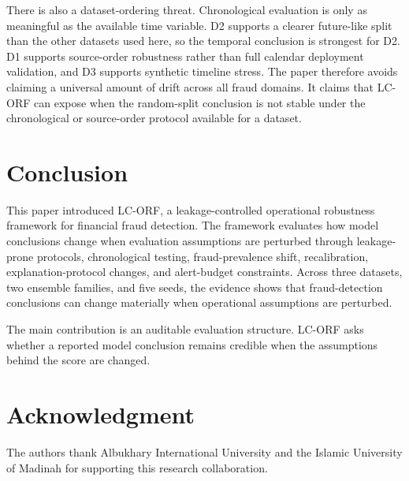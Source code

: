 \documentclass{ieeeaccess}
\begin{document}
There is also a dataset-ordering threat. Chronological evaluation is only as meaningful as the available time variable. D2 supports a clearer future-like split than the other datasets used here, so the temporal conclusion is strongest for D2. D1 supports source-order robustness rather than full calendar deployment validation, and D3 supports synthetic timeline stress. The paper therefore avoids claiming a universal amount of drift across all fraud domains. It claims that LC-ORF can expose when the random-split conclusion is not stable under the chronological or source-order protocol available for a dataset.

\section{Conclusion}
\label{sec:conclusion}
This paper introduced LC-ORF, a leakage-controlled operational robustness framework for financial fraud detection. The framework evaluates how model conclusions change when evaluation assumptions are perturbed through leakage-prone protocols, chronological testing, fraud-prevalence shift, recalibration, explanation-protocol changes, and alert-budget constraints. Across three datasets, two ensemble families, and five seeds, the evidence shows that fraud-detection conclusions can change materially when operational assumptions are perturbed.

The main contribution is an auditable evaluation structure. LC-ORF asks whether a reported model conclusion remains credible when the assumptions behind the score are changed.

\section*{Acknowledgment}
The authors thank Albukhary International University and the Islamic University of Madinah for supporting this research collaboration.





\end{document}
